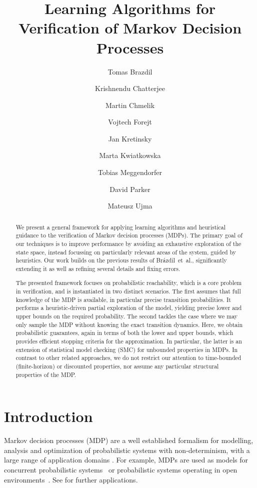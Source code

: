 \documentclass{article}
\title{Learning Algorithms for Verification of Markov Decision Processes}
\author{Tomas Brazdil \and Krishnendu Chatterjee \and Martin Chmelik \and Vojtech Forejt \and Jan Kretinsky \and Marta Kwiatkowska \and Tobias Meggendorfer \and David Parker \and Mateusz Ujma}\date{}
\begin{document}
	\maketitle
	
	\begin{abstract}
		We present a general framework for applying learning algorithms and heuristical guidance to the verification of Markov decision processes (MDPs).
The primary goal of our techniques is to improve performance by avoiding an exhaustive exploration of the state space, instead focussing on particularly relevant areas of the system, guided by heuristics.
Our work builds on the previous results of Br{\'{a}}zdil~et~al., significantly extending it as well as refining several details and fixing errors.

The presented framework focuses on probabilistic reachability, which is a core problem in verification, and is instantiated in two distinct scenarios.
The first assumes that full knowledge of the MDP is available, in particular precise transition probabilities.
It performs a heuristic-driven partial exploration of the model, yielding precise lower and upper bounds on the required probability.
The second tackles the case where we may only sample the MDP without knowing the exact transition dynamics.
Here, we obtain probabilistic guarantees, again in terms of both the lower and upper bounds, which provides efficient stopping criteria for the approximation.
In particular, the latter is an extension of statistical model checking (SMC) for unbounded properties in MDPs.
In contrast to other related approaches, we do not restrict our attention to time-bounded (finite-horizon) or discounted properties, nor assume any particular structural properties of the MDP.
	\end{abstract}



	\section{Introduction} \label{sec:introduction}


Markov decision processes (MDP) \cite{howard1960dynamic,filar1996competitive,DBLP:books/wi/Puterman94} are a well established formalism for modelling, analysis and optimization of probabilistic systems with non-determinism, with a large range of application domains \cite{DBLP:books/daglib/0020348,DBLP:conf/cav/KwiatkowskaNP11}.
For example, MDPs are used as models for concurrent probabilistic systems~\cite{DBLP:journals/jacm/CourcoubetisY95} or probabilistic systems operating in open environments~\cite{segala1996modeling}.
See \cite{white1985real,white1988further,white1993survey} for further applications.
\end{document}
